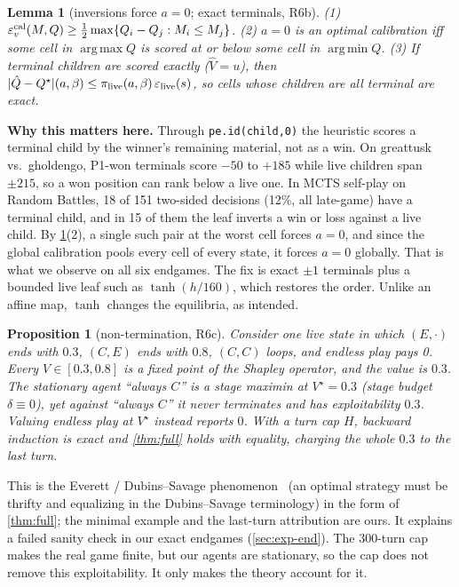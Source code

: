 \documentclass[10pt]{article}
\theoremstyle{plain}
\newtheorem{lemma}[theorem]{Lemma}
\newtheorem{proposition}[theorem]{Proposition}
\theoremstyle{definition}
\theoremstyle{remark}
\newcommand{\epsv}{\varepsilon_v}
\newcommand{\Qhat}{\hat Q}
\newcommand{\Qstar}{Q^\star}
\newcommand{\Vstar}{V^\star}
\DeclareMathOperator*{\argmin}{arg\,min}
\DeclareMathOperator*{\argmax}{arg\,max}
\begin{document}
\begin{lemma}[inversions force $a=0$; exact terminals, R6b]\label{lem:R6b}
(1) $\epsv^{\rm cal}(M,Q)\ge\frac12\max\{Q_i-Q_j:M_i\le M_j\}$. (2) $a=0$ is an optimal calibration iff some cell in $\argmax Q$ is scored at or below some cell in $\argmin Q$. (3) If terminal children are scored exactly ($\hat V=u$), then $|\Qhat-\Qstar|(a,\beta)\le\pi_{\rm live}(a,\beta)\,\varepsilon_{\rm live}(s)$, so cells whose children are all terminal are exact.
\end{lemma}
\textbf{Why this matters here.} Through \texttt{pe.id(child,0)} the heuristic scores a terminal child by the winner's remaining material, not as a win. On greattusk vs.\ gholdengo, P1-won terminals score $-50$ to $+185$ while live children span $\pm215$, so a won position can rank below a live one. In MCTS self-play on Random Battles, 18 of 151 two-sided decisions (12\%, all late-game) have a terminal child, and in 15 of them the leaf inverts a win or loss against a live child. By \cref{lem:R6b}(2), a single such pair at the worst cell forces $a=0$, and since the global calibration pools every cell of every state, it forces $a=0$ globally. That is what we observe on all six endgames. The fix is exact $\pm1$ terminals plus a bounded live leaf such as $\tanh(h/160)$, which restores the order. Unlike an affine map, $\tanh$ changes the equilibria, as intended.

\begin{proposition}[non-termination, R6c]\label{prop:R6c}
Consider one live state in which $(E,\cdot)$ ends with $0.3$, $(C,E)$ ends with $0.8$, $(C,C)$ loops, and endless play pays 0. Every $V\in[0.3,0.8]$ is a fixed point of the Shapley operator, and the value is $0.3$. The stationary agent ``always $C$'' is a stage maximin at $\Vstar=0.3$ (stage budget $\delta\equiv0$), yet against ``always $C$'' it never terminates and has exploitability $0.3$. Valuing endless play at $\Vstar$ instead reports $0$. With a turn cap $H$, backward induction is exact and \cref{thm:full} holds with equality, charging the whole $0.3$ to the last turn.
\end{proposition}
This is the Everett / Dubins--Savage phenomenon~\cite{Everett57,DS65,MS96} (an optimal strategy must be thrifty and equalizing in the Dubins--Savage terminology) in the form of \cref{thm:full}; the minimal example and the last-turn attribution are ours. It explains a failed sanity check in our exact endgames (\cref{sec:exp-end}). The 300-turn cap makes the real game finite, but our agents are stationary, so the cap does not remove this exploitability. It only makes the theory account for it.
\end{document}
